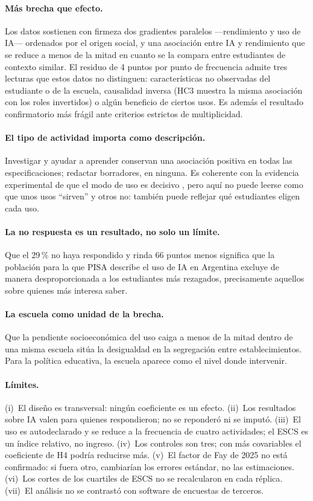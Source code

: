 \documentclass[11pt,a4paper]{article}
\begin{document}
\paragraph{Más brecha que efecto.} Los datos sostienen con firmeza dos gradientes paralelos ---rendimiento y uso de IA--- ordenados por el origen social, y una asociación entre IA y rendimiento que se reduce a menos de la mitad en cuanto se la compara entre estudiantes de contexto similar. El residuo de 4 puntos por punto de frecuencia admite tres lecturas que estos datos no distinguen: características no observadas del estudiante o de la escuela, causalidad inversa (HC3 muestra la misma asociación con los roles invertidos) o algún beneficio de ciertos usos. Es además el resultado confirmatorio más frágil ante criterios estrictos de multiplicidad.

\paragraph{El tipo de actividad importa como descripción.} Investigar y ayudar a aprender conservan una asociación positiva en todas las especificaciones; redactar borradores, en ninguna. Es coherente con la evidencia experimental de que el modo de uso es decisivo \parencite{bastani2025}, pero aquí no puede leerse como que unos usos \enquote{sirven} y otros no: también puede reflejar qué estudiantes eligen cada uso.

\paragraph{La no respuesta es un resultado, no solo un límite.} Que el 29\,\% no haya respondido y rinda 66 puntos menos significa que la población para la que PISA describe el uso de IA en Argentina excluye de manera desproporcionada a los estudiantes más rezagados, precisamente aquellos sobre quienes más interesa saber.

\paragraph{La escuela como unidad de la brecha.} Que la pendiente socioeconómica del uso caiga a menos de la mitad dentro de una misma escuela sitúa la desigualdad en la segregación entre establecimientos. Para la política educativa, la escuela aparece como el nivel donde intervenir.

\paragraph{Límites.} (i)~El diseño es transversal: ningún coeficiente es un efecto. (ii)~Los resultados sobre IA valen para quienes respondieron; no se reponderó ni se imputó. (iii)~El uso es autodeclarado y se reduce a la frecuencia de cuatro actividades; el ESCS es un índice relativo, no ingreso. (iv)~Los controles son tres; con más covariables el coeficiente de H4 podría reducirse más. (v)~El factor de Fay de 2025 no está confirmado: si fuera otro, cambiarían los errores estándar, no las estimaciones. (vi)~Los cortes de los cuartiles de ESCS no se recalcularon en cada réplica. (vii)~El análisis no se contrastó con software de encuestas de terceros.
\end{document}
